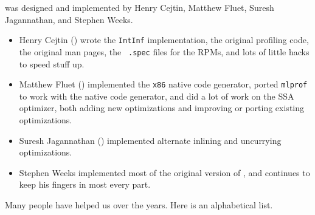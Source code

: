 
{\mlton} was designed and implemented by Henry Cejtin, Matthew Fluet, Suresh
Jagannathan, and Stephen Weeks.

\begin{itemize}

\item
Henry Cejtin () wrote the {\tt IntInf}
implementation, the original profiling code, the original man pages, the {\tt
.spec} files for the RPMs, and lots of little hacks to speed stuff up.

\item
Matthew Fluet () implemented the {\tt x86} native
code generator, ported {\tt mlprof} to work with the native code generator, and
did a lot of work on the SSA optimizer, both adding new optimizations and
improving or porting existing optimizations.

\item
Suresh Jagannathan () implemented
alternate inlining and uncurrying optimizations.

\item
Stephen Weeks implemented most of the original version of {\mlton}, and
continues to keep his fingers in most every part.

\end{itemize}

Many people have helped us over the years.  Here is an alphabetical list.


